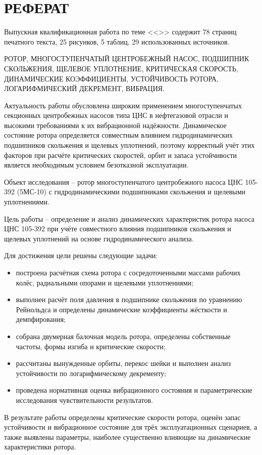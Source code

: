 \section*{РЕФЕРАТ}

Выпускная квалификационная работа по теме <<\varTheme>> содержит 78 страниц печатного текста, 25 рисунков, 5 таблиц, 29 использованных источников.

РОТОР, МНОГОСТУПЕНЧАТЫЙ ЦЕНТРОБЕЖНЫЙ НАСОС, ПОДШИПНИК СКОЛЬЖЕНИЯ, ЩЕЛЕВОЕ УПЛОТНЕНИЕ, КРИТИЧЕСКАЯ СКОРОСТЬ, ДИНАМИЧЕСКИЕ КОЭФФИЦИЕНТЫ, УСТОЙЧИВОСТЬ РОТОРА, ЛОГАРИФМИЧЕСКИЙ ДЕКРЕМЕНТ, ВИБРАЦИЯ.

Актуальность работы обусловлена широким применением многоступенчатых секционных центробежных насосов типа ЦНС в нефтегазовой отрасли и высокими требованиями к их вибрационной надёжности. Динамическое состояние ротора определяется совместным влиянием гидродинамических подшипников скольжения и щелевых уплотнений, поэтому корректный учёт этих факторов при расчёте критических скоростей, орбит и запаса устойчивости является необходимым условием безотказной эксплуатации.

Объект исследования -- ротор многоступенчатого центробежного насоса ЦНС 105-392 (5МС-10) с гидродинамическими подшипниками скольжения и щелевыми уплотнениями.

Цель работы -- определение и анализ динамических характеристик ротора насоса ЦНС 105-392 при учёте совместного влияния подшипников скольжения и щелевых уплотнений на основе гидродинамического анализа.

Для достижения цели решены следующие задачи:
\begin{itemize}
    \item построена расчётная схема ротора с сосредоточенными массами рабочих колёс, радиальными опорами и щелевыми уплотнениями;
    \item выполнен расчёт поля давления в подшипнике скольжения по уравнению Рейнольдса и определены динамические коэффициенты жёсткости и демпфирования;
    \item собрана двумерная балочная модель ротора, определены собственные частоты, формы изгиба и критические скорости;
    \item рассчитаны вынужденные орбиты, перекос шейки и выполнен анализ устойчивости по логарифмическому декременту;
    \item проведена нормативная оценка вибрационного состояния и параметрические исследования чувствительности результатов.
\end{itemize}

В результате работы определены критические скорости ротора, оценён запас устойчивости и вибрационное состояние для трёх эксплуатационных сценариев, а также выявлены параметры, наиболее существенно влияющие на динамические характеристики ротора.

